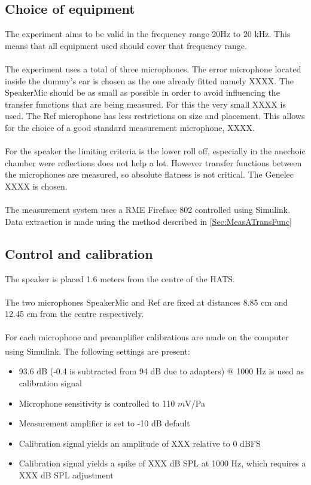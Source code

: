\subsection{Choice of equipment}
The experiment aims to be valid in the frequency range 20Hz to 20 kHz. This means that all equipment used should cover that frequency range. \\\\
The experiment uses a total of three microphones. The error microphone located inside the dummy's ear is chosen as the one already fitted namely XXXX. The SpeakerMic should be as small as possible in order to avoid influencing the transfer functions that are being measured. For this the very small XXXX is used. The Ref microphone has less restrictions on size and placement. This allows for the choice of a good standard measurement microphone, XXXX. \\\\
For the speaker the limiting criteria is the lower roll off, especially in the anechoic chamber were reflections does not help a lot. However transfer functions between the microphones are measured, so absolute flatness is not critical. The Genelec XXXX is chosen. \\\\
The measurement system uses a RME Fireface 802 controlled using Simulink. Data extraction is made using the method described in \autoref{Sec:MeasATransFunc}

\subsection{Control and calibration}
The speaker is placed 1.6 meters from the centre of the HATS. \\\\
The two microphones SpeakerMic and Ref are fixed at distances 8.85 cm and 12.45 cm from the centre respectively. \\\\
For each microphone and preamplifier calibrations are made on the computer using Simulink\textsuperscript{\textregistered}. The following settings are present:
\begin{itemize}
	\item 93.6 dB (-0.4 is subtracted from 94 dB due to adapters) $@$ 1000 Hz is used as calibration signal
	\item Microphone sensitivity is controlled to 110 $m$V/Pa
	\item Measurement amplifier is set to -10 dB default
	\item Calibration signal yields an amplitude of XXX relative to 0 dBFS
	\item  Calibration signal yields a spike of XXX dB SPL at 1000 Hz, which requires a XXX dB SPL adjustment
\end{itemize}

